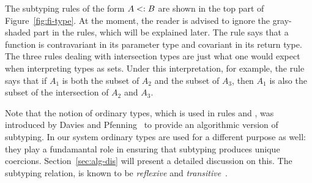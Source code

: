 

The subtyping rules of the form $A <: B$ are shown in the top part of
Figure~\ref{fig:fi-type}. At the moment, the reader is advised to ignore the
gray-shaded part in the rules, which will be explained later. The rule
 says that a function is contravariant in its parameter
type and covariant in its return type. The three rules dealing with
intersection types are just what one would expect when interpreting types as
sets. Under this interpretation, for example, the rule 
says that if $A_1$ is both the subset of $A_2$ and the subset of $A_3$, then
$A_1$ is also the subset of the intersection of $A_2$ and $A_3$.

Note that the notion of ordinary types, which is used in rules
 and , was
introduced by Davies and Pfenning~\cite{davies2000intersection} to provide an algorithmic version of
subtyping. In our system ordinary types are used for a different 
purpose as well: they play a fundamantal role in ensuring that 
subtyping produces unique coercions. Section~\ref{sec:alg-dis} will present 
a detailed discussion on this. The subtyping relation, is known to be
\emph{reflexive} and \emph{transitive}~\cite{davies2000intersection}. 

\begin{comment}
\begin{lemma}[Subtyping is reflexive] \label{lemma:sub-refl}
  For all types $ A $, $ A \subtype A $.
\end{lemma}

\begin{lemma}[Subtyping is transitive] \label{lemma:sub-trans}
  If $ A_1 \subtype A_2 $ and $ A_2 \subtype A_3 $,
  then $ A_1 \subtype A_3 $.
\end{lemma}
\end{comment}


